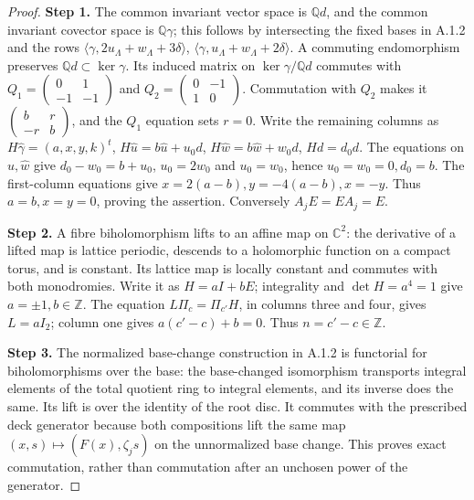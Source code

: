 \documentclass[11pt,a4paper]{article}
\theoremstyle{plain}
\theoremstyle{definition}
\begin{document}
\begin{proof}
\par\smallskip\noindent\textbf{Step 1.} The common invariant vector space is $\mathbb Qd$, and the common invariant covector space is $\mathbb Q\gamma$; this follows by intersecting the fixed bases in A.1.2 and the rows $\langle\gamma,2u_{\Lambda}+w_{\Lambda}+3\delta\rangle$, $\langle\gamma,u_{\Lambda}+w_{\Lambda}+2\delta\rangle$. A commuting endomorphism preserves $\mathbb Qd\subset\ker\gamma$. Its induced matrix on $\ker\gamma/\mathbb Qd$ commutes with
$Q_1=\left(\begin{smallmatrix}0&1\\-1&-1\end{smallmatrix}\right)$ and $Q_2=\left(\begin{smallmatrix}0&-1\\1&0\end{smallmatrix}\right)$. Commutation with $Q_2$ makes it $\left(\begin{smallmatrix}b&r\\-r&b\end{smallmatrix}\right)$, and the $Q_1$ equation sets $r=0$. Write the remaining columns as
$H\widehat\gamma=(a,x,y,k)^t$, $H\widehat u=b\widehat u+u_0d$, $H\widehat w=b\widehat w+w_0d$, $Hd=d_0d$. The equations on $\widehat u,\widehat w$ give $d_0-w_0=b+u_0$, $u_0=2w_0$ and $u_0=w_0$, hence $u_0=w_0=0,d_0=b$. The first-column equations give $x=2(a-b),y=-4(a-b),x=-y$. Thus $a=b,x=y=0$, proving the assertion. Conversely $A_jE=EA_j=E$.

\par\smallskip\noindent\textbf{Step 2.} A fibre biholomorphism lifts to an affine map on $\mathbb C^2$: the derivative of a lifted map is lattice periodic, descends to a holomorphic function on a compact torus, and is constant. Its lattice map is locally constant and commutes with both monodromies. Write it as $H=aI+bE$; integrality and $\det H=a^4=1$ give $a=\pm1,b\in\mathbb Z$. The equation $L\Pi_c=\Pi_{c'}H$, in columns three and four, gives $L=aI_2$; column one gives $a(c'-c)+b=0$. Thus $n=c'-c\in\mathbb Z$.

\par\smallskip\noindent\textbf{Step 3.} The normalized base-change construction in A.1.2 is functorial for biholomorphisms over the base: the base-changed isomorphism transports integral elements of the total quotient ring to integral elements, and its inverse does the same. Its lift is over the identity of the root disc. It commutes with the prescribed deck generator because both compositions lift the same map $(x,s)\mapsto(F(x),\zeta_js)$ on the unnormalized base change. This proves exact commutation, rather than commutation after an unchosen power of the generator.


\end{proof}
\end{document}
